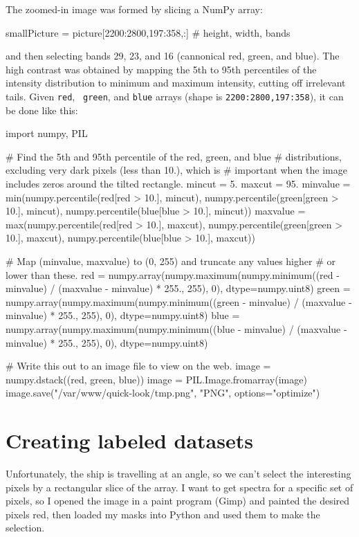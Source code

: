 \documentclass[12pt]{article}
\begin{document}
The zoomed-in image was formed by slicing a NumPy array:
\begin{python}
smallPicture = picture[2200:2800,197:358,:]    # height, width, bands
\end{python}
and then selecting bands 29, 23, and 16 (cannonical red, green, and
blue).  The high contrast was obtained by mapping the 5th to 95th
percentiles of the intensity distribution to minimum and maximum
intensity, cutting off irrelevant tails.  Given {\tt red}, {\tt
  green}, and {\tt blue} arrays (shape is {\tt 2200:2800,197:358}), it
can be done like this:
\begin{python}
import numpy, PIL

# Find the 5th and 95th percentile of the red, green, and blue
# distributions, excluding very dark pixels (less than 10.), which is
# important when the image includes zeros around the tilted rectangle.
mincut = 5.
maxcut = 95.
minvalue = min(numpy.percentile(red[red > 10.], mincut),
               numpy.percentile(green[green > 10.], mincut),
               numpy.percentile(blue[blue > 10.], mincut))
maxvalue = max(numpy.percentile(red[red > 10.], maxcut),
               numpy.percentile(green[green > 10.], maxcut),
               numpy.percentile(blue[blue > 10.], maxcut))

# Map (minvalue, maxvalue) to (0, 255) and truncate any values higher
# or lower than these.
red = numpy.array(numpy.maximum(numpy.minimum((red - minvalue) /
                      (maxvalue - minvalue) * 255., 255), 0),
                  dtype=numpy.uint8)
green = numpy.array(numpy.maximum(numpy.minimum((green - minvalue) /
                      (maxvalue - minvalue) * 255., 255), 0),
                  dtype=numpy.uint8)
blue = numpy.array(numpy.maximum(numpy.minimum((blue - minvalue) /
                      (maxvalue - minvalue) * 255., 255), 0),
                  dtype=numpy.uint8)

# Write this out to an image file to view on the web.
image = numpy.dstack((red, green, blue))
image = PIL.Image.fromarray(image)
image.save("/var/www/quick-look/tmp.png", "PNG", options="optimize")
\end{python}

\section{Creating labeled datasets}

Unfortunately, the ship is travelling at an angle, so we can't select
the interesting pixels by a rectangular slice of the array.  I want to
get spectra for a specific set of pixels, so I opened the image in a
paint program (Gimp) and painted the desired pixels red, then loaded my
masks into Python and used them to make the selection.
\end{document}
